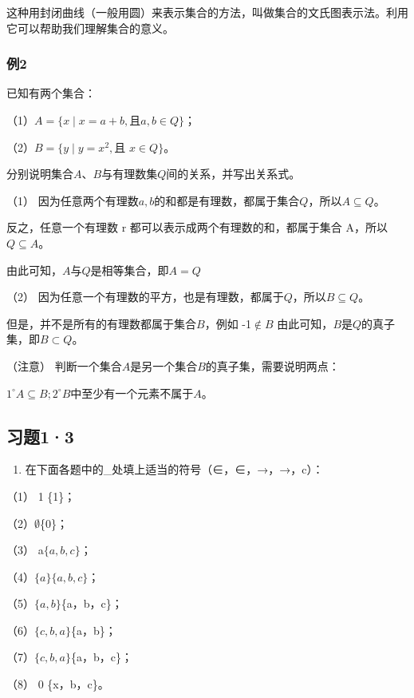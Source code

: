 这种用封闭曲线（一般用圆）来表示集合的方法，叫做集合的文氏图表示法。利用它可以帮助我们理解集合的意义。

\subsubsection{例2}

已知有两个集合：

（1）\(A = \{x \mid x = a + b, \text{且} a, b \in Q\}\)；

（2）\(B = \{y \mid y=x^2,\text{且 }x\in Q\}\)。

分别说明集合\(A\)、\(B\)与有理数集\(Q\)间的关系，并写出关系式。

 （1）
因为任意两个有理数\(a, b\)的和都是有理数，都属于集合\(Q\)，所以\(A \subseteq Q\)。

反之，任意一个有理数 r 都可以表示成两个有理数的和，都属于集合
A，所以\(Q \subseteq A\)。

由此可知，\(A\)与\(Q\)是相等集合，即\(A = Q\)

（2）
因为任意一个有理数的平方，也是有理数，都属于\(Q\)，所以\(B \subseteq Q\)。

但是，并不是所有的有理数都属于集合\(B\)，例如 -1\(\notin B\)
由此可知，\(B\)是\(Q\)的真子集，即\(B \subset Q\)。

（注意） 判断一个集合\(A\)是另一个集合\(B\)的真子集，需要说明两点：

\(1^{\circ} A \subseteq B; 2^{\circ} B\)中至少有一个元素不属于\(A\)。

\subsection{习题1·3}

\begin{enumerate}
\item
  在下面各题中的\_处填上适当的符号（∈，∈，→，→，c）：
\end{enumerate}

（1） 1 \{1\}；

（2）\(\emptyset\)\{0\}；

（3） a\(\{a, b, c\}\)；

（4）\(\{a\}\)\(\{a, b, c\}\)；

（5）\(\{a, b\}\)\{a，b，c\}；

（6）\(\{c, b, a\}\)\{a，b\}；

（7）\(\{c, b, a\}\)\{a，b，c\}；

（8） 0 \{x，b，c\}。

